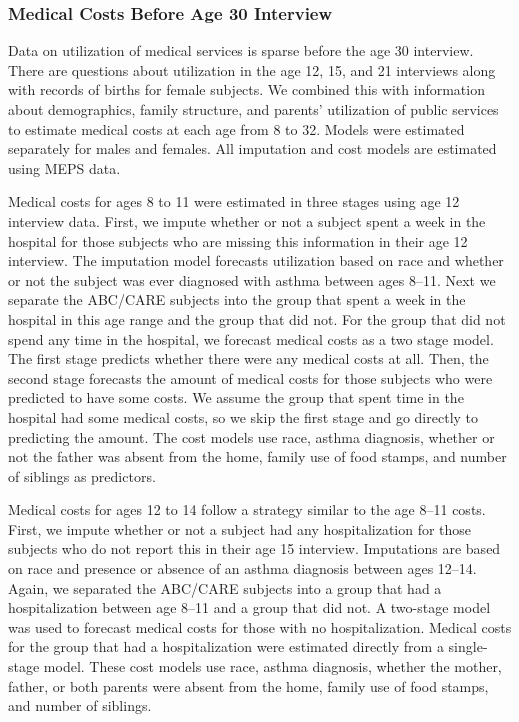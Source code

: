 \subsubsection{Medical Costs Before Age 30 Interview}
\label{appendix:health-costs-before-age30}

\noindent Data on utilization of medical services is sparse before the age 30 interview. There are questions about utilization in the age 12, 15, and 21 interviews along with records of births for female subjects. We combined this with information about demographics, family structure, and parents' utilization of public services to estimate medical costs at each age from 8 to 32. Models were estimated separately for males and females. All imputation and cost models are estimated using MEPS data.

\noindent Medical costs for ages 8 to 11 were estimated in three stages using age 12 interview data. First, we impute whether or not a subject spent a week in the hospital for those subjects who are missing this information in their age 12 interview. The imputation model forecasts utilization based on race and whether or not the subject was ever diagnosed with asthma between ages 8--11. Next we separate the ABC/CARE subjects into the group that spent a week in the hospital in this age range and the group that did not. For the group that did not spend any time in the hospital, we forecast medical costs as a two stage model. The first stage predicts whether there were any medical costs at all. Then, the second stage forecasts the amount of medical costs for those subjects who were predicted to have some costs. We assume the group that spent time in the hospital had some medical costs, so we skip the first stage and go directly to predicting the amount. The cost models use race, asthma diagnosis, whether or not the father was absent from the home, family use of food stamps, and number of siblings as predictors.

\noindent Medical costs for ages 12 to 14 follow a strategy similar to the age 8--11 costs. First, we impute whether or not a subject had any hospitalization for those subjects who do not report this in their age 15 interview. Imputations are based on race and presence or absence of an asthma diagnosis between ages 12--14. Again, we separated the ABC/CARE subjects into a group that had a hospitalization between age 8--11 and a group that did not. A two-stage model was used to forecast medical costs for those with no hospitalization. Medical costs for the group that had a hospitalization were estimated directly from a single-stage model. These cost models use race, asthma diagnosis, whether the mother, father, or both parents were absent from the home, family use of food stamps, and number of siblings.

